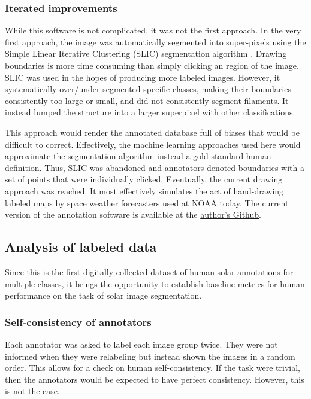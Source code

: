 \documentclass[twoside]{report}
\begin{document}
\subsubsection{Iterated improvements}
While this software is not complicated, it was not the first approach. In the very first approach, the image was automatically segmented into super-pixels using the Simple Linear Iterative Clustering (SLIC) segmentation algorithm \cite{SLIC}. Drawing boundaries is more time consuming than simply clicking an region of the image. SLIC was used in the hopes of producing more labeled images. However, it systematically over/under segmented specific classes, making their boundaries consistently too large or small, and did not consistently segment filaments. It instead lumped the structure into a larger superpixel with other classifications. 

This approach would render the annotated database full of biases that would be difficult to correct. Effectively, the machine learning approaches used here would approximate the segmentation algorithm instead a gold-standard human definition. Thus, SLIC was abandoned and annotators denoted boundaries with a set of points that were individually clicked. Eventually, the current drawing approach was reached. It most effectively simulates the act of hand-drawing labeled maps by space weather forecasters used at NOAA today. The current version of the annotation software is available at the \href{https://github.com/jmbhughes/smachy}{author's Github}. 
\subsection{Analysis of labeled data}
Since this is the first digitally collected dataset of human solar annotations for multiple classes, it brings the opportunity to establish baseline metrics for human performance on the task of solar image segmentation. 

\subsubsection{Self-consistency of annotators} \label{sec:consistency}

Each annotator was asked to label each image group twice. They were not informed when they were relabeling but instead shown the images in a random order. This allows for a check on human self-consistency. If the task were trivial, then the annotators would be expected to have perfect consistency. However, this is not the case. 
\end{document}
